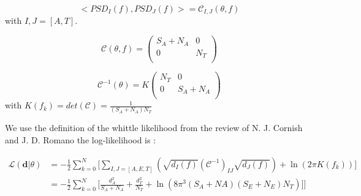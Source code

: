 \documentclass[a4paper,12pt]{article}
\begin{document}
\begin{equation}
    <PSD_I(f),PSD_J(f)> = \mathcal{C}_{I,J}(\theta,f)
\end{equation}
with $I,J = [A,T]$.

 \begin{equation}
     \mathcal{C}(\theta,f) =
     \left(
     \begin{array}{cc}
      S_A + N_A & 0 \\
      0 & N_T\\
     \end{array}
     \right)
 \end{equation}
 
  \begin{equation}
     \mathcal{C}^{-1}(\theta) = K
     \left(
     \begin{array}{cc}
      N_T & 0\\%
      0 & S_A + N_A\\
     \end{array}
     \right)
 \end{equation}
 with $K(f_k) = det(\mathcal{C}) = \frac{1}{(S_A + N_A)N_T}$
 
 We use the definition of the whittle likelihood from the review of N. J. Cornish and J. D. Romano \cite{Romano2017} the log-likelihood is :
 
 \begin{equation} 
\begin{split}
          \mathcal{L}(\textbf{d}|\theta) & =  -\frac{1}{2} \sum_{k=0}^N \Bigg[ \sum_{I,J = [A,E,T]} \left( \sqrt{d_I(f)} \left(\mathcal{C}^{-1}\right)_{IJ} \sqrt{d_J(f)} \right)  + \ln\left(2\pi K(f_k) \right) \Bigg] \\
    &=  -\frac{1}{2} \sum_{k=0}^N \Bigg[ \frac{d_A^2}{S_A+N_A}   +\frac{d_T^2}{N_T} + \ln\left(8\pi^3 (S_A+NA)(S_E+N_E)N_T \right) \Bigg]  \Bigg] 
\end{split}
\end{equation}
\end{document}
